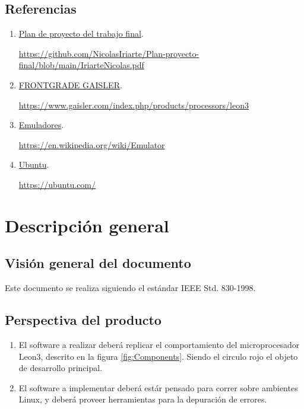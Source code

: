 \documentclass[
  11pt, %
  codirector, %
]{charter}
\begin{document}
\subsection{Referencias}
\label{sec:org62711e0}

\begin{enumerate}
\item \href{https://github.com/NicolasIriarte/Plan-proyecto-final/blob/main/IriarteNicolas.pdf}{Plan de proyecto del trabajo final}.


  \url{https://github.com/NicolasIriarte/Plan-proyecto-final/blob/main/IriarteNicolas.pdf}

\item \href{https://www.gaisler.com/index.php/products/processors/leon3}{FRONTGRADE GAISLER}.

\url{https://www.gaisler.com/index.php/products/processors/leon3}


\item \href{https://en.wikipedia.org/wiki/Emulator}{Emuladores}.

\url{https://en.wikipedia.org/wiki/Emulator}

\item \href{https://ubuntu.com/}{Ubuntu}.

\url{https://ubuntu.com/}

\end{enumerate}

\section{Descripción general}
\label{sec:orgc1c4017}

\subsection{Visión general del documento}
\label{sec:orgdaca22c}

Este documento se realiza siguiendo el estándar IEEE Std. 830-1998.


\subsection{Perspectiva del producto}
\label{sec:org24980a8}

\begin{enumerate}
\item El software a realizar deberá replicar el comportamiento del microprocesador Leon3, descrito en la figura \ref{fig:Components}. Siendo el circulo rojo el objeto de desarrollo principal.
\item El software a implementar deberá estár pensado para correr sobre ambientes Linux, y deberá proveer herramientas para la depuración de errores.
\end{enumerate}
\end{document}
